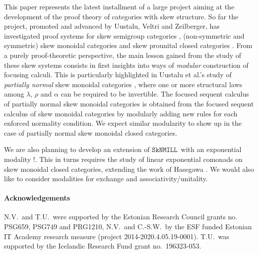 \documentclass[copyright,creativecommons]{eptcs}
\theoremstyle{definition}
\newcommand{\SkNMILL}{$\mathtt{SkNMILL}$}
\begin{document}
This paper represents the latest installment of a large project aiming at the development of the proof theory of categories with skew structure. So far the project, promoted and advanced by Uustalu, Veltri and Zeilberger, has investigated proof systems for skew semigroup categories \cite{zeilberger:semiassociative:19}, (non-symmetric and symmetric) skew monoidal categories \cite{uustalu:sequent:2021,uustalu:proof:nodate,veltri:coherence:2021} and skew prounital closed categories \cite{uustalu:deductive:nodate}. From a purely proof-theoretic perspective, the main lesson gained from the study of these skew systems consists in first insights into ways of \emph{modular} construction of focusing calculi. This is particularly highlighted in Uustalu et al.'s study of \emph{partially normal} skew monoidal categories \cite{uustalu:proof:nodate}, where one or more structural laws among $\lambda$, $\rho$ and $\alpha$ can be required to be invertible. The focused sequent calculus of partially normal skew monoidal categories is obtained from the focused sequent calculus of skew monoidal categories by modularly adding new rules for each enforced normality condition.
We expect similar modularity to show up in the case of partially normal skew monoidal closed categories.

We are also planning to develop an extension of \SkNMILL\ with an exponential modality $!$. This in turns requires the study of linear exponential comonads on skew monoidal closed categories, extending the work of Hasegawa \cite{hasegawa:linear:2017}. We would also like to consider modalities for exchange \cite{jiang:lambek:2019} and associativity/unitality.

\paragraph{Acknowledgements} N.V.\ and T.U.\ were supported by the
Estonian Research Council grants no. \linebreak PSG659, PSG749 and PRG1210, N.V.\ and
C.-S.W.\ by the ESF funded Estonian IT Academy research measure
(project 2014-2020.4.05.19-0001). T.U.\ was supported by the Icelandic
Research Fund grant no.~196323-053.

  
  
\end{document}
